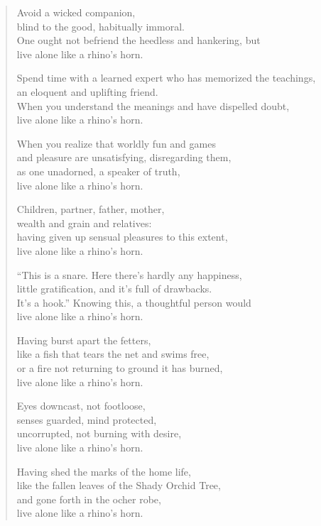 \documentclass[12pt,openany]{book}%
\begin{document}
\begin{verse}
Avoid a wicked companion, \\
blind to the good, habitually immoral. \\
One ought not befriend the heedless and hankering, but \\
live alone like a rhino’s horn. 

Spend time with a learned expert who has memorized the teachings, \\
an eloquent and uplifting friend. \\
When you understand the meanings and have dispelled doubt, \\
live alone like a rhino’s horn. 

When you realize that worldly fun and games \\
and pleasure are unsatisfying, disregarding them, \\
as one unadorned, a speaker of truth, \\
live alone like a rhino’s horn. 

Children, partner, father, mother, \\
wealth and grain and relatives: \\
having given up sensual pleasures to this extent, \\
live alone like a rhino’s horn. 

“This is a snare. Here there’s hardly any happiness, \\
little gratification, and it’s full of drawbacks. \\
It’s a hook.” Knowing this, a thoughtful person would \\
live alone like a rhino’s horn. 

Having burst apart the fetters, \\
like a fish that tears the net and swims free, \\
or a fire not returning to ground it has burned, \\
live alone like a rhino’s horn. 

Eyes downcast, not footloose, \\
senses guarded, mind protected, \\
uncorrupted, not burning with desire, \\
live alone like a rhino’s horn. 

Having shed the marks of the home life, \\
like the fallen leaves of the Shady Orchid Tree, \\
and gone forth in the ocher robe, \\
live alone like a rhino’s horn. 


\end{verse}
\end{document}
